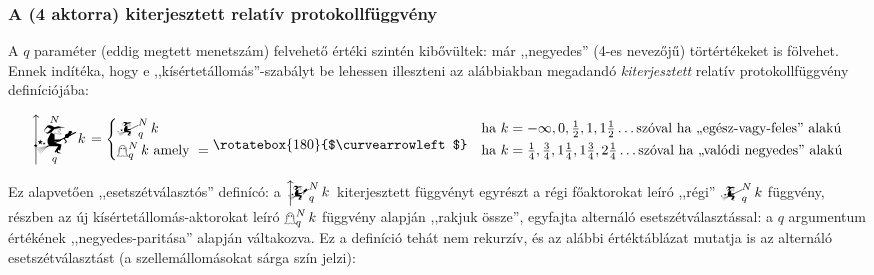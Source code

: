 \documentclass{article}
\newcommand{\nothing}{\text{\raisebox{0.4em}{\rotatebox{180}{$\curvearrowleft$}}}}%
\newcommand{\mainfuncomm}[3]{\mathwitch_{#2}^{#1}#3}
\newcommand{\mainfunext}[3]{\left\uparrow\!\!\!\mathwitch*_{#2}^{#1}#3\right.}
\newcommand{\gbh}[3]{\mathop{\mathghost}^{#1}_{#2}#3}
\begin{document}
	\subsubsection{A (4 aktorra) kiterjesztett relatív protokollfüggvény}

	A $q$ paraméter (eddig megtett menetszám) felvehető értéki szintén kibővültek: már ,,negyedes'' (4-es nevezőjű) törtértékeket is fölvehet. Ennek indítéka, hogy e ,,kísértetállomás''-szabályt be lehessen illeszteni az alábbiakban megadandó \emph{kiterjesztett} relatív protokollfüggvény definíciójába:

	\[
		\mainfunext Nqk =
		\begin{cases}
			\mainfuncomm Nqk & \text{ha } k = -\infty, 0, \frac12, 1, 1\frac12\dots \text{szóval ha ,,egész-vagy-feles'' alakú}\\
			\gbh Nqk \text{ amely } =\nothing & \text{ha } k = \frac14, \frac34, 1\frac14, 1\frac34, 2\frac14\dots \text{szóval ha ,,valódi negyedes'' alakú}
		\end{cases}
	\]

	Ez alapvetően  ,,esetszétválasztós'' definícó: a $\mainfunext Nqk$ kiterjesztett függvényt egyrészt a régi főaktorokat leíró ,,régi'' $\mainfuncomm Nqk$ függvény, részben az új kísértetállomás-aktorokat leíró $\gbh Nqk$ függvény alapján ,,rakjuk össze'', egyfajta alternáló esetszétválasztással: a $q$ argumentum értékének ,,negyedes-paritása'' alapján váltakozva.
	Ez a definíció tehát nem rekurzív, és az alábbi értéktáblázat mutatja is az alternáló esetszétválasztást (a szellemállomásokat sárga szín jelzi):
\end{document}
